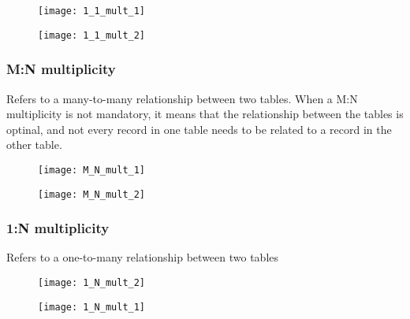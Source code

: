 \begin{minipage}{0.45\textwidth}
\begin{figure}[H]
    \centering
    \texttt{[image: 1\_1\_mult\_1]}
\end{figure}
\end{minipage}
\hfill
\begin{minipage}{0.45\textwidth}
\begin{figure}[H]
    \centering
    \texttt{[image: 1\_1\_mult\_2]}
\end{figure}
\end{minipage}


\subsubsection{M:N multiplicity}

Refers to a many-to-many relationship between two tables. When a M:N multiplicity is not mandatory, it means that the relationship between the tables is optinal, and not every record in one table needs to be related to a record in the other table.

\begin{minipage}{0.45\textwidth}
\begin{figure}[H]
    \centering
    \texttt{[image: M\_N\_mult\_1]}
\end{figure}
\end{minipage}
\hfill
\begin{minipage}{0.45\textwidth}
\begin{figure}[H]
    \centering
    \texttt{[image: M\_N\_mult\_2]}
\end{figure}
\end{minipage}

\subsubsection{1:N multiplicity}

Refers to a one-to-many relationship between two tables

\begin{minipage}{0.45\textwidth}
\begin{figure}[H]
    \centering
    \texttt{[image: 1\_N\_mult\_2]}
\end{figure}
\end{minipage}
\hfill
\begin{minipage}{0.45\textwidth}
\begin{figure}[H]
    \centering
    \texttt{[image: 1\_N\_mult\_1]}
\end{figure}
\end{minipage}
